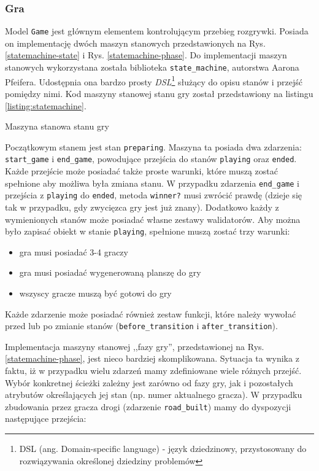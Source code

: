 \documentclass[a4paper,12pt]{article}
\providecommand{\imref}[1]{Rys. \ref{#1}} %
\begin{document}
\subsubsection{Gra}
Model \texttt{Game} jest głównym elementem kontrolującym przebieg
rozgrywki. Posiada on implementację dwóch maszyn stanowych
przedstawionych na \imref{statemachine-state} i
\imref{statemachine-phase}. Do implementacji maszyn stanowych
wykorzystana została biblioteka \texttt{state\_machine}, autorstwa
Aarona Pfeifera. Udostępnia ona bardzo prosty \emph{DSL}\footnote{DSL
  (ang. Domain-specific language) - język dziedzinowy, przystosowany
  do rozwiązywania określonej dziedziny problemów} służący do opisu
stanów i przejść pomiędzy nimi. Kod maszyny stanowej stanu gry został
przedstawiony na listingu \ref{listing:statemachine}.

\begin{listing}
  
  \caption{Maszyna stanowa stanu gry}
  \label{listing:statemachine}
\end{listing}

Początkowym stanem jest stan \texttt{preparing}.  Maszyna ta posiada
dwa zdarzenia: \texttt{start\_game} i \texttt{end\_game}, powodujące
przejścia do stanów \texttt{playing} oraz \texttt{ended}. Każde
przejście może posiadać także proste warunki, które muszą zostać
spełnione aby możliwa była zmiana stanu. W przypadku zdarzenia
\texttt{end\_game} i przejścia z \texttt{playing} do \texttt{ended},
metoda \texttt{winner?} musi zwrócić prawdę (dzieje się tak w
przypadku, gdy zwycięzca gry jest już znany). Dodatkowo każdy z
wymienionych stanów może posiadać własne zestawy walidatorów. Aby
można było zapisać obiekt w stanie \texttt{playing}, spełnione muszą
zostać trzy warunki:

\begin{itemize}
\item gra musi posiadać 3-4 graczy
\item gra musi posiadać wygenerowaną planszę do gry
\item wszyscy gracze muszą być gotowi do gry
\end{itemize}

Każde zdarzenie może posiadać również zestaw funkcji, które należy
wywołać przed lub po zmianie stanów (\texttt{before\_transition} i
\texttt{after\_transition}).

Implementacja maszyny stanowej ,,fazy gry'', przedstawionej na
\imref{statemachine-phase}, jest nieco bardziej
skomplikowana. Sytuacja ta wynika z faktu, iż w przypadku wielu
zdarzeń mamy zdefiniowane wiele różnych przejść. Wybór konkretnej
ścieżki zależny jest zarówno od fazy gry, jak i pozostałych atrybutów
określających jej stan (np. numer aktualnego gracza). W przypadku
zbudowania przez gracza drogi (zdarzenie \texttt{road\_built}) mamy do
dyspozycji następujące przejścia:
\end{document}
